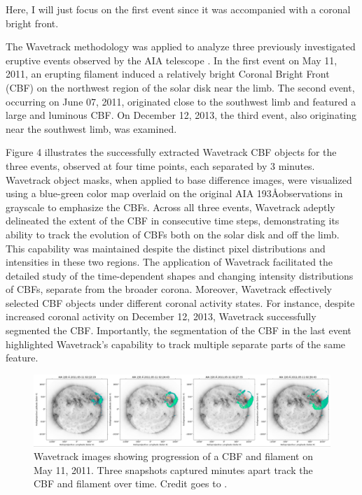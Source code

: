 Here, I will just focus on the first event since it was accompanied with a coronal bright front.

The Wavetrack methodology was applied to analyze three previously investigated eruptive events observed by the AIA telescope \citep{kozarev_2015, kozarev_2017}. In the first event on May 11, 2011, an erupting filament induced a relatively bright Coronal Bright Front (CBF) on the northwest region of the solar disk near the limb. The second event, occurring on June 07, 2011, originated close to the southwest limb and featured a large and luminous CBF. On December 12, 2013, the third event, also originating near the southwest limb, was examined.

Figure 4 illustrates the successfully extracted Wavetrack CBF objects for the three events, observed at four time points, each separated by 3 minutes. Wavetrack object masks, when applied to base difference images, were visualized using a blue-green color map overlaid on the original AIA 193\AA observations in grayscale to emphasize the CBFs. Across all three events, Wavetrack adeptly delineated the extent of the CBF in consecutive time steps, demonstrating its ability to track the evolution of CBFs both on the solar disk and off the limb. This capability was maintained despite the distinct pixel distributions and intensities in these two regions. The application of Wavetrack facilitated the detailed study of the time-dependent shapes and changing intensity distributions of CBFs, separate from the broader corona. Moreover, Wavetrack effectively selected CBF objects under different coronal activity states. For instance, despite increased coronal activity on December 12, 2013, Wavetrack successfully segmented the CBF. Importantly, the segmentation of the CBF in the last event highlighted Wavetrack's capability to track multiple separate parts of the same feature.

\begin{figure}
	\centering
	\includegraphics[width=0.9\hsize]{chapter2/figs/fig_1105011_wave_filament_fourpanel_plot.png}
	\caption{Wavetrack images showing progression of a CBF and filament on May 11, 2011. Three snapshots captured  minutes apart track the CBF and filament over time. Credit goes to \citet{stepanyuk_2022}.}
	\label{fig_wavetrack_cbf_filament}
\end{figure}

